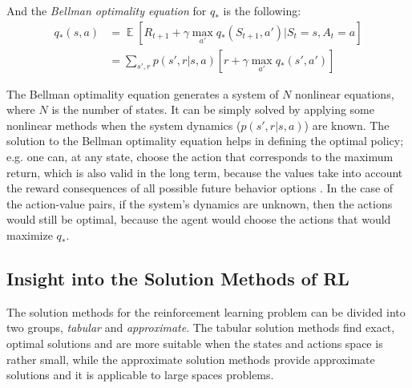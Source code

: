 And the \textit{Bellman optimality equation} for $q_{*}$ is the following:
\begin{equation}\label{BellmanOptimalityQstar}
\begin{split}
q_{*}(s,a)&=\mathop{{}\mathbb{E}}\left [ R_{t+1} + \gamma \max_{a'}q_{*}(S_{t+1},a')|S_{t}=s, A_{t}=a  \right ] \\
&=\sum_{s',r}p(s',r|s,a)\left [ r+\gamma\max_{a'}q_{*}(s',a') \right ]
\end{split}
\end{equation}

The Bellman optimality equation generates a system of $N$ nonlinear equations, where $N$ is the number of states. It can be simply solved by applying some nonlinear methods when the system dynamics ($p(s',r|s,a)$) are known. The solution to the Bellman optimality equation helps in defining the optimal policy; e.g. one can, at any state, choose the action that corresponds to the maximum return, which is also valid in the long term, because the values take into account the reward consequences of all possible future behavior options \cite{Sutton}. In the case of the action-value pairs, if the system's dynamics are unknown, then the actions would still be optimal, because the agent would choose the actions that would maximize $q_{*}$.

\subsection{Insight into the Solution Methods of RL}
The solution methods for the reinforcement learning problem can be divided into two groups, \textit{tabular} and \textit{approximate}. The tabular solution methods find exact, optimal solutions and are more suitable when the states and actions space is rather small, while the approximate solution methods provide approximate solutions and it is applicable to large spaces problems.

